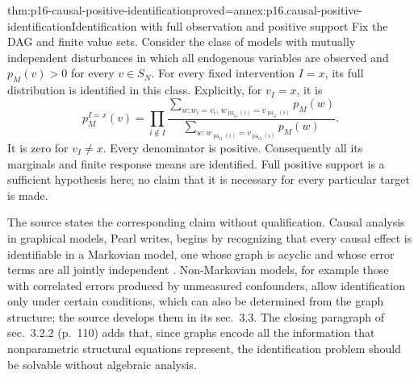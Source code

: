 \begin{hbtheorem}{thm:p16-causal-positive-identification}{proved=annex:p16.causal-positive-identification}{Identification with full observation and positive support}
Fix the DAG and finite value sets. Consider the class of models with
mutually independent disturbances in which all endogenous variables are
observed and \(p_M(v)>0\) for every \(v\in S_N\).
For every fixed intervention \(I=x\), its full distribution is identified
in this class. Explicitly, for \(v_I=x\), it is
\[
 p_M^{I=x}(v)=\prod_{i\notin I}
 \frac{\displaystyle\sum_{w:w_i=v_i,\,
                      w_{\operatorname{pa}_G(i)}=v_{\operatorname{pa}_G(i)}}p_M(w)}
      {\displaystyle\sum_{w:w_{\operatorname{pa}_G(i)}=v_{\operatorname{pa}_G(i)}}p_M(w)}.
\]
It is zero for \(v_I\ne x\). Every denominator is positive.
Consequently all its marginals and finite response means are identified.
Full positive support is a sufficient hypothesis here; no claim that it is
necessary for every particular target is made.
\end{hbtheorem}

The source states the corresponding claim without qualification. Causal
analysis in graphical models, Pearl writes, begins by recognizing that
every causal effect is identifiable in a Markovian model, one whose graph
is acyclic and whose error terms are all jointly independent \cite[sec.~3.2.3, p.~110]{Pearl2009CausalOverview}.
Non-Markovian models, for example those with correlated errors produced by
unmeasured confounders, allow identification only under certain
conditions, which can also be determined from the graph structure; the
source develops them in its sec.~3.3. The closing paragraph of
sec.~3.2.2 (p.~110) adds that, since graphs encode all the information
that nonparametric structural equations represent, the identification
problem should be solvable without algebraic analysis.

